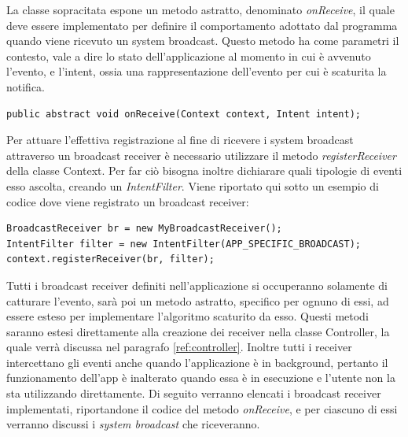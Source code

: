 La classe sopracitata espone un metodo astratto, denominato \textit{onReceive}, il quale deve essere implementato per definire il comportamento adottato dal programma quando viene ricevuto un system broadcast. Questo metodo ha come parametri il contesto, vale a dire lo stato dell'applicazione al momento in cui è avvenuto l'evento, e l'intent, ossia una rappresentazione dell'evento per cui è scaturita la notifica.

\begin{verbatim}
public abstract void onReceive(Context context, Intent intent);
\end{verbatim}

Per attuare l'effettiva registrazione al fine di ricevere i system broadcast attraverso un broadcast receiver è necessario utilizzare il metodo \textit{registerReceiver} della classe Context. Per far ciò bisogna inoltre dichiarare quali tipologie di eventi esso ascolta, creando un \textit{IntentFilter}. Viene riportato qui sotto un esempio di codice dove viene registrato un broadcast receiver:
\begin{verbatim}
BroadcastReceiver br = new MyBroadcastReceiver();
IntentFilter filter = new IntentFilter(APP_SPECIFIC_BROADCAST);
context.registerReceiver(br, filter);
\end{verbatim}

Tutti i broadcast receiver definiti nell'applicazione si occuperanno solamente di catturare l'evento, sarà poi un metodo astratto, specifico per ognuno di essi, ad essere esteso per implementare l'algoritmo scaturito da esso. Questi metodi saranno estesi direttamente alla creazione dei receiver nella classe Controller, la quale verrà discussa nel paragrafo \ref{ref:controller}. Inoltre tutti i receiver intercettano gli eventi anche quando l'applicazione è in background, pertanto il funzionamento dell'app è inalterato quando essa è in esecuzione e l'utente non la sta utilizzando direttamente. Di seguito verranno elencati i broadcast receiver implementati, riportandone il codice del metodo \textit{onReceive}, e per ciascuno di essi verranno discussi i \textit{system broadcast} che riceveranno.

